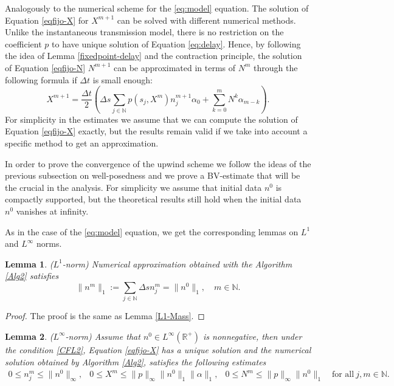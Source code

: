 \documentclass[11pt,a4paper]{article}
\newcommand{\R}{\mathbb{R}}
\newcommand{\N}{\mathbb{N}}
\newtheorem{lemma}{Lemma}[section]
\begin{document}
Analogously to the numerical scheme for the \eqref{eq:model} equation. The solution of Equation \eqref{eqfijo-X} for $X^{m+1}$ can be solved with different numerical methods. Unlike the instantaneous transmission model, 
there is no restriction on the coefficient $p$ to have unique solution of Equation \eqref{eq:delay}. Hence, by following the idea of Lemma \ref{fixedpoint-delay} and the contraction principle, the solution of Equation \eqref{eqfijo-N} $N^{m+1}$ can be approximated in terms of $N^{m}$ through the following formula if $\Delta t$ is small enough:
\begin{equation*}
X^{m+1}=\frac{\Delta t}{2} \left( \Delta s \sum_{j\in\N}p(s_j,X^{m})n_j^{m+1} \alpha_0 + \sum_{k=0}^{m} N^k\alpha_{m-k} \right).
\end{equation*}
For simplicity in the estimates we assume that we can compute the solution of Equation \eqref{eqfijo-X} exactly, but the results remain valid if we take into account a specific method to get an approximation.

In order to prove the convergence of the upwind scheme we follow the ideas of the previous subsection on well-posedness and we prove a BV-estimate that will be the crucial in the analysis. For simplicity we assume that initial data $n^0$ is compactly supported, but the theoretical results still hold when the initial data $n^0$ vanishes at infinity.

As in the case of the \eqref{eq:model} equation, we get the corresponding lemmas on $L^1$ and $L^\infty$ norms.

 \begin{lemma}{(\textbf{$L^{1}$}-norm)} Numerical approximation obtained with the Algorithm \ref{Alg2} satisfies 
 \begin{equation*}
     \|n^{m}\|_1:=\sum_{j\in\N}\Delta s n_j^m=\|n^{0}\|_1, \quad m\in\N.
 \end{equation*}
 \end{lemma}
 \begin{proof}
The proof is the same as Lemma \ref{L1-Mass}.
 \end{proof}

\begin{lemma}{(\textbf{$L^{\infty}$}-norm)}
 Assume that $n^0\in L^\infty(\R^+)$ is nonnegative, then under the condition \eqref{CFL2}, Equation \eqref{eqfijo-X} has a unique solution and the numerical solution obtained by Algorithm \ref{Alg2}, satisfies the following estimates
 \begin{eqnarray*}
 0\le n_j^m\le \|n^0\|_{\infty}, &  0\le X^m\le \|p\|_{\infty}\|n^0\|_1\|\alpha\|_1, &  0\le N^m\le \|p\|_{\infty}\|n^0\|_1\quad\textrm{for all}\:j,m\in\N.
 \end{eqnarray*}
\end{lemma}
\end{document}

